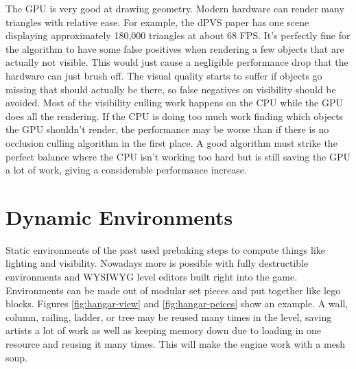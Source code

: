 \documentclass[12pt]{ucthesis}
\begin{document}
The GPU is very good at drawing geometry.
Modern hardware can render many triangles with relative ease.
For example, the dPVS paper has one scene displaying approximately 180,000 triangles at about 68 FPS.\cite{dpvs}
It's perfectly fine for the algorithm to have some false positives when rendering a few objects that are actually not visible.
This would just cause a negligible performance drop that the hardware can just brush off.\cite{large-occluders}
The visual quality starts to suffer if objects go missing that should actually be there, so false negatives on visibility should be avoided.
Most of the visibility culling work happens on the CPU while the GPU does all the rendering.
If the CPU is doing too much work finding which objects the GPU shouldn't render, the performance may be worse than if there is no occlusion culling algorithm in the first place.
A good algorithm must strike the perfect balance where the CPU isn't working too hard but is still saving the GPU a lot of work, giving a considerable performance increase.

\section{Dynamic Environments}
\label{dynamic-environments}

Static environments of the past used prebaking steps to compute things like lighting and visibility.
Nowadays more is possible with fully destructible environments and WYSIWYG level editors built right into the game.
Environments can be made out of modular set pieces and put together like lego blocks.
Figures \ref{fig:hangar-view} and \ref{fig:hangar-peices} show an example.
A wall, column, railing, ladder, or tree may be reused many times in the level, saving artists a lot of work as well as keeping memory down due to loading in one resource and reusing it many times.
This will make the engine work with a mesh soup.
\end{document}

